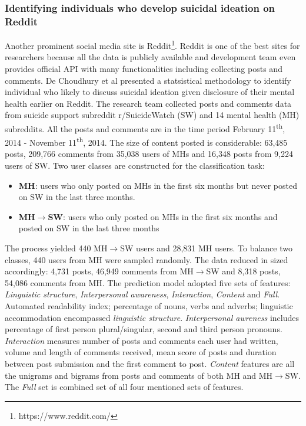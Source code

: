 \subsubsection*{Identifying individuals who develop suicidal ideation on Reddit}
Another prominent social media site is Reddit\footnote{https://www.reddit.com/}. Reddit is one of the best sites for researchers because all the data is publicly available and development team even provides official API with many functionalities including collecting posts and comments. De Choudhury et al \cite{DeChoudhury2016} presented a statsistical methodology to identify individual who likely to discuss suicidal ideation given disclosure of their mental health earlier on Reddit. The research team collected posts and comments data from suicide support subreddit r/SuicideWatch (SW) and 14 mental health (MH) subreddits. All the posts and comments are in the time period February 11\textsuperscript{th}, 2014 - November 11\textsuperscript{th}, 2014. The size of content posted is considerable: 63,485 posts, 209,766 comments from 35,038 users of MHs and 16,348 posts from 9,224 users of SW. Two user classes are constructed for the classification task:
\begin{itemize}
\item \textbf{MH}: users who only posted on MHs in the first six months but never posted on SW in the last three months. 
\item \textbf{MH$\rightarrow$SW}: users who only posted on MHs in the first six months and posted on SW in the last three months
\end{itemize}
The process yielded 440 MH$\rightarrow$SW users and 28,831 MH users. To balance two classes, 440 users from MH were sampled randomly. The data reduced in sized accordingly: 4,731 posts, 46,949 comments from MH$\rightarrow$SW and 8,318 posts, 54,086 comments from MH. The prediction model adopted five sets of features: \textit{Linguistic structure}, \textit{Interpersonal awareness}, \textit{Interaction}, \textit{Content} and \textit{Full}. Automated readability index; percentage of nouns, verbs and adverbs; linguistic accommodation encompassed \textit{linguistic structure}. \textit{Interpersonal awreness} includes percentage of first person plural/singular, second and third person pronouns. \textit{Interaction} measures number of posts and comments each user had written, volume and length of comments received, mean score of posts and duration between post submission and the first comment to post. \textit{Content} features are all the unigrams and bigrams from posts and comments of both MH and MH$\rightarrow$SW. The \textit{Full} set is combined set of all four mentioned sets of features.\\
